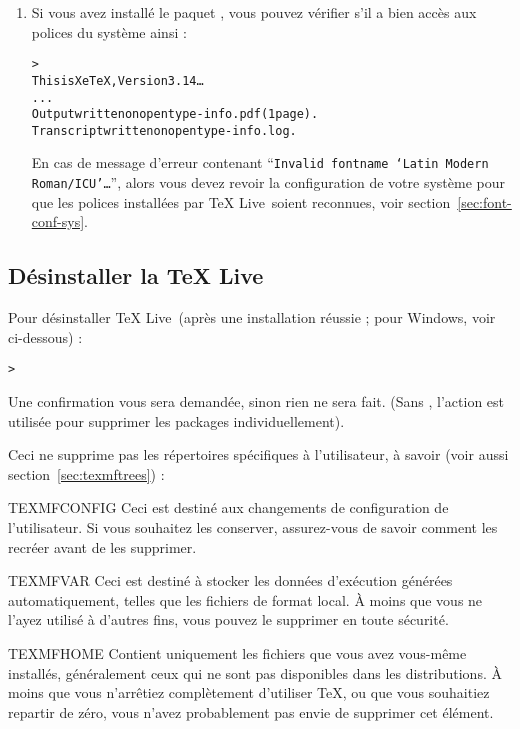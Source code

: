 \documentclass[german, english, french]{article}
\renewcommand{\samp}[1]{\enquote{\texttt{#1}}}
\renewcommand{\TL}{\TeX{} Live\xspace}%
\begin{document}
\begin{enumerate}
\item Si vous avez installé le paquet , vous pouvez vérifier s'il
  a bien accès aux polices du système ainsi :
  \begin{alltt}
> 
This is XeTeX, Version 3.14\dots
...
Output written on opentype-info.pdf (1 page).
Transcript written on opentype-info.log.
\end{alltt}

En cas de message d'erreur contenant \samp{Invalid fontname `Latin Modern
  Roman/ICU'\dots}, alors vous devez revoir la configuration de votre système
pour que les polices installées par \TL\ soient reconnues, voir
section~\ref{sec:font-conf-sys}.

\end{enumerate}

\subsection{Désinstaller la \TL}
\label{sec:uninstall}

Pour désinstaller \TL\ (après une installation réussie ; pour Windows, voir
ci-dessous) :

\begin{alltt}
> 
\end{alltt}

Une confirmation vous sera demandée, sinon rien ne sera fait.  (Sans
, l'action  est utilisée pour supprimer les
packages individuellement).

Ceci ne supprime pas les répertoires spécifiques à l'utilisateur, à savoir (voir
aussi section~\ref{sec:texmftrees}) :

\begin{ttdescription}
\item [TEXMFCONFIG] Ceci est destiné aux changements de configuration de
  l'utilisateur.  Si vous souhaitez les conserver, assurez-vous de savoir
  comment les recréer avant de les supprimer.

\item [TEXMFVAR] Ceci est destiné à stocker les données d'exécution générées
  automatiquement, telles que les fichiers de format local. À moins que vous ne
  l'ayez utilisé à d'autres fins, vous pouvez le supprimer en toute sécurité.

\item [TEXMFHOME] Contient uniquement les fichiers que vous avez vous-même
  installés, généralement ceux qui ne sont pas disponibles dans les
  distributions. À moins que vous n'arrêtiez complètement d'utiliser \TeX, ou
  que vous souhaitiez repartir de zéro, vous n'avez probablement pas envie de
  supprimer cet élément.

\end{ttdescription}
\end{document}
